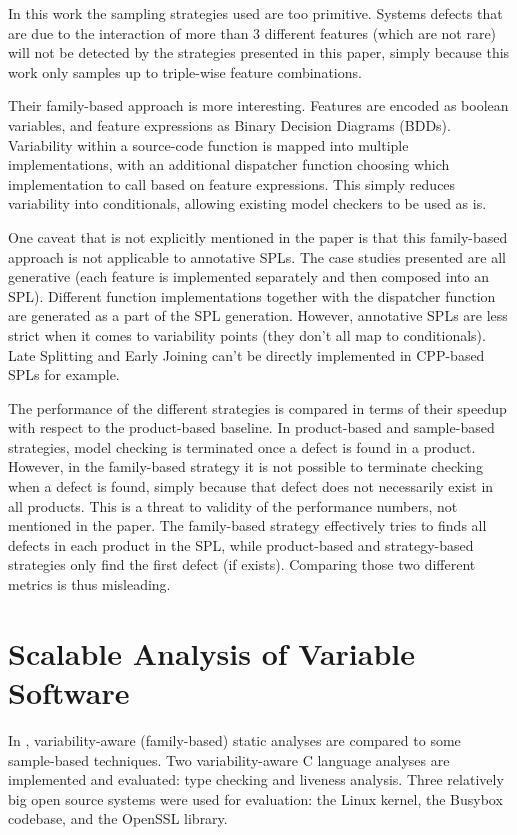 \documentclass[11pt]{article}
\begin{document}
In this work the sampling strategies used are too primitive. Systems defects that are due to the interaction of more than 3 different features (which are not rare) will not be detected by the strategies presented in this paper, simply because this work only samples up to triple-wise feature combinations.

Their family-based approach is more interesting. Features are encoded as boolean variables, and feature expressions as Binary Decision Diagrams (BDDs). Variability within a source-code function is mapped into multiple implementations, with an additional dispatcher function choosing which implementation to call based on feature expressions. This simply reduces variability into conditionals, allowing existing model checkers to be used as is.

One caveat that is not explicitly mentioned in the paper is that this family-based approach is not applicable to annotative SPLs. The case studies presented are all generative (each feature is implemented separately and then composed into an SPL). Different function implementations together with the dispatcher function are generated as a part of the SPL generation. However, annotative SPLs are less strict when it comes to variability points (they don't all map to conditionals). Late Splitting and Early Joining can't be directly implemented in CPP-based SPLs for example.

The performance of the different strategies is compared in terms of their speedup with respect to the product-based baseline. In product-based and sample-based strategies, model checking is terminated once a defect is found in a product. However, in the family-based strategy it is not possible to terminate checking when a defect is found, simply because that defect does not necessarily exist in all products. This is a threat to validity of the performance numbers, not mentioned in the paper. The family-based strategy effectively tries to finds all defects in each product in the SPL, while product-based and strategy-based strategies only find the first defect (if exists). Comparing those two different metrics is thus misleading.

\section{Scalable Analysis of Variable Software}
In \cite{Liebig:2013}, variability-aware (family-based) static analyses are compared to some sample-based techniques. Two variability-aware C language analyses are implemented and evaluated: type checking and liveness analysis. Three relatively big open source systems were used for evaluation: the Linux kernel, the Busybox codebase, and the OpenSSL library.
\end{document}
